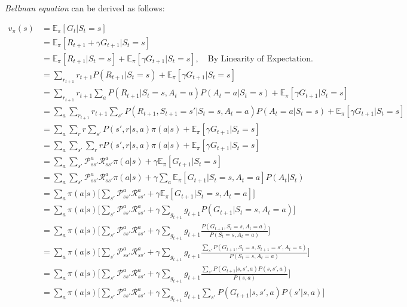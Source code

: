 \begin{appendices}
\textit{Bellman equation} can be derived as follows:

\begin{align*}
	v_\pi(s) &= \mathbb{E}_{\pi}[G_t|S_t = s]\\ 
	&= \mathbb{E}_{\pi}[R_{t+1}+\gamma G_{t+1}|S_t = s]\\ 
	&= \mathbb{E}_{\pi}[R_{t+1}|S_t = s] + \mathbb{E}_{\pi}[\gamma G_{t+1}|S_t = s], \quad \text{By Linearity of Expectation.}\\
	&= \sum_{r_{t+1}}r_{t+1} P(R_{t+1}|S_t = s) + \mathbb{E}_{\pi}[\gamma G_{t+1}|S_t = s]\\
	&= \sum_{r_{t+1}}r_{t+1} \sum_a P(R_{t+1}|S_t = s, A_t=a)P(A_t=a|S_t=s) + \mathbb{E}_{\pi}[\gamma G_{t+1}|S_t = s]\\
	&=\sum_a \sum_{r_{t+1}}r_{t+1} \sum_{s'}  P(R_{t+1}, S_{t+1}=s'|S_t = s, A_t=a)P(A_t=a|S_t=s) + \mathbb{E}_{\pi}[\gamma G_{t+1}|S_t = s]\\
&=\sum_a \sum_{r}r \sum_{s'} P(s',r|s, a)\pi(a|s) + \mathbb{E}_{\pi}[\gamma G_{t+1}|S_t = s]\\
&=\sum_a \sum_{s'} \sum_{r}r P(s',r|s, a)\pi(a|s) + \mathbb{E}_{\pi}[\gamma G_{t+1}|S_t = s]\\
&=\sum_a \sum_{s'} \mathcal{P}_{ss'}^a\mathcal{R}_{ss'}^a \pi(a|s)+ \gamma \mathbb{E}_{\pi}[ G_{t+1}|S_t = s]\\
&=\sum_a \sum_{s'}\mathcal{P}_{ss'}^a\mathcal{R}_{ss'}^a \pi(a|s) + \gamma \sum_{a}\mathbb{E}_{\pi}[ G_{t+1}|S_t = s, A_{t}=a]P(A_{t}|S_{t})\\
&=\sum_a \pi(a|s) \Bigg[\sum_{s'} \mathcal{P}_{ss'}^a\mathcal{R}_{ss'}^a + \gamma \mathbb{E}_{\pi}[ G_{t+1}|S_t = s, A_{t}=a]\Bigg]\\
&=\sum_a \pi(a|s)\Bigg[\sum_{s'} \mathcal{P}_{ss'}^a\mathcal{R}_{ss'}^a + \gamma \sum_{g_{t+1}}g_{t+1}P( G_{t+1}|S_t = s, A_{t}=a)\Bigg]\\
&=\sum_a \pi(a|s) \Bigg[\sum_{s'} \mathcal{P}_{ss'}^a\mathcal{R}_{ss'}^a + \gamma \sum_{g_{t+1}}g_{t+1}\frac{P( G_{t+1},S_t = s, A_{t}=a)}{P(S_t = s, A_{t}=a)}\Bigg]\\
&=\sum_a \pi(a|s)\Bigg[\sum_{s'} \mathcal{P}_{ss'}^a\mathcal{R}_{ss'}^a + \gamma \sum_{g_{t+1}}g_{t+1}\frac{\sum_{s'}P( G_{t+1},S_t = s, S_{t+1}=s', A_{t}=a)}{P(S_t = s, A_{t}=a)}\Bigg]\\
&=\sum_a \pi(a|s)\Bigg[\sum_{s'} \mathcal{P}_{ss'}^a\mathcal{R}_{ss'}^a + \gamma \sum_{g_{t+1}}g_{t+1}\frac{\sum_{s'}P( G_{t+1}|s, s', a)P(s, s', a)}{P(s, a)}\Bigg]\\
&=\sum_a \pi(a|s)\Bigg[\sum_{s'} \mathcal{P}_{ss'}^a\mathcal{R}_{ss'}^a + \gamma \sum_{g_{t+1}}g_{t+1}\sum_{s'}P( G_{t+1}|s, s', a)P(s'| s, a)\Bigg]\\

\end{align*}
\end{appendices}
